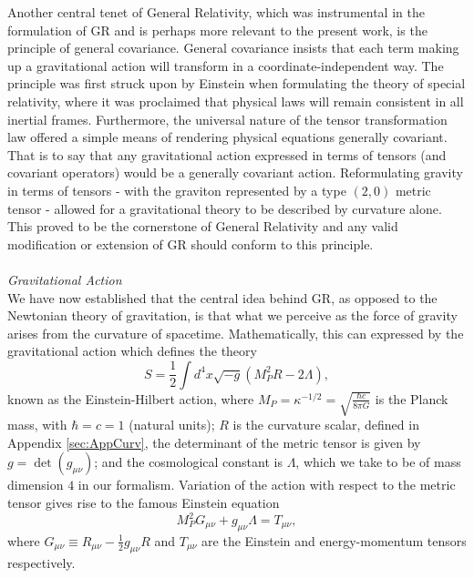 Another central tenet of General Relativity, which was instrumental in the formulation of GR and is perhaps more relevant to the present work, is the principle of general covariance. General covariance insists that each term making up a gravitational action will transform in a coordinate-independent way. The principle was first struck upon by Einstein when formulating the theory of special relativity, where it was proclaimed that physical laws will remain consistent in all inertial frames. Furthermore, the universal nature of the tensor transformation law offered a simple means of rendering physical equations generally covariant. That is to say that  any gravitational action expressed in terms of tensors (and covariant operators) would be a generally covariant action. Reformulating gravity in terms of tensors - with the graviton represented by a type $(2,0)$ metric tensor - allowed for a gravitational theory to be described by curvature alone. This proved to be the cornerstone of General Relativity and any valid modification or extension of GR should conform to this principle.
\\\\\emph{Gravitational Action}\\
We have now established that the central idea behind GR, as opposed to the Newtonian theory of gravitation, is that what we perceive as the force of gravity arises from the curvature of spacetime.   Mathematically, this can expressed by the gravitational action which defines the theory
\[
\label{EH}
S=\frac{1}{2}\int d^4x \sqrt{-g}\left(M_P^2 R-2\Lambda\right)
,\]
known as the Einstein-Hilbert action, where $M_P=\kappa^{-1/2}=\sqrt{\frac{\hbar c}{8\pi G}}$
is the Planck mass, with $\hbar=c=1$ (natural units); $R$ is the curvature scalar, defined in Appendix \ref{sec:AppCurv}, the determinant of the metric tensor is given by $g=\det(g_{\mu\nu})$;  and  the cosmological constant is $\Lambda$, which we take to be of mass dimension $4$ in our formalism. Variation of the action with respect to the metric tensor gives rise to the famous Einstein equation
\[
\label{EinsteinEq}
M_P^2 G_{\mu\nu}+g_{\mu\nu}\Lambda= T_{\mu\nu}
,\]
where $G_{\mu\nu}\equiv R_{\mu\nu}-\frac{1}{2}g_{\mu\nu}R$ and $T_{\mu\nu}$ are the Einstein and energy-momentum tensors respectively.
%
